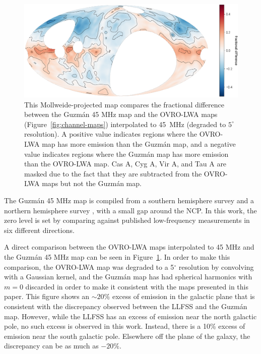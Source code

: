 \begin{bibunit}
\begin{figure}[t]
    \centering
    \includegraphics[width=\textwidth]{figures/chapter3/guzman}
    \caption{
        This Mollweide-projected map compares the fractional difference between the Guzm\'{a}n 45
        MHz map and the OVRO-LWA maps (Figure~\ref{fig:channel-maps}) interpolated to 45~MHz
        (degraded to $5^\circ$ resolution). A positive value indicates regions where the OVRO-LWA
        map has more emission than the Guzm\'{a}n map, and a negative value indicates regions where
        the Guzm\'{a}n map has more emission than the OVRO-LWA map. Cas A, Cyg A, Vir A, and Tau A
        are masked due to the fact that they are subtracted from the OVRO-LWA maps but not the
        Guzm\'{a}n map.
    }
    \label{fig:guzman-comparison}
\end{figure}

The Guzm\'{a}n 45 MHz map \citep{2011A&A...525A.138G} is compiled from a southern hemisphere survey
\citep{1997A&AS..124..315A} and a northern hemisphere survey \citep{1999A&AS..140..145M}, with a
small gap around the NCP. In this work, the zero level is set by comparing against published
low-frequency measurements in six different directions.

A direct comparison between the OVRO-LWA maps interpolated to 45 MHz and the Guzm\'{a}n 45 MHz map
can be seen in Figure~\ref{fig:guzman-comparison}. In order to make this comparison, the OVRO-LWA
map was degraded to a 5$^\circ$ resolution by convolving with a Gaussian kernel, and the Guzm\'{a}n
map has had spherical harmonics with $m=0$ discarded in order to make it consistent with the maps
presented in this paper. This figure shows an $\sim20\%$ excess of emission in the galactic plane
that is consistent with the discrepancy observed between the LLFSS and the Guzm\'{a}n map.  However,
while the LLFSS has an excess of emission near the north galactic pole, no such excess is observed
in this work. Instead, there is a 10\% excess of emission near the south galactic pole. Elsewhere off
the plane of the galaxy, the discrepancy can be as much as $-20\%$.


\end{bibunit}
